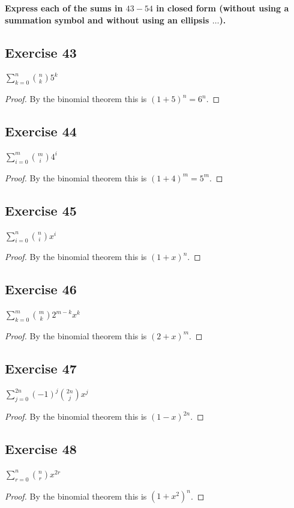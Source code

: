 \documentclass[14pt]{extarticle}
\newcommand{\dps}{\displaystyle}
\newcommand{\cy}{\color{cyan}}
\begin{document}
{\bf \cy Express each of the sums in \(43-54\) in closed form (without using a summation symbol and without using an
ellipsis \(\ldots\)).}

\subsection{Exercise 43}
\(\sum_{k=0}^{n} \binom{n}{k} 5^{k}\)
\begin{proof}
     By the binomial theorem this is \((1+5)^n = 6^n\).
\end{proof}

\subsection{Exercise 44}
\(\dps \sum_{i=0}^{m} \binom{m}{i} 4^{i}\)
\begin{proof}
     By the binomial theorem this is \((1+4)^m = 5^m\).
\end{proof}

\subsection{Exercise 45}
\(\dps \sum_{i=0}^{n} \binom{n}{i} x^{i}\)
\begin{proof}
     By the binomial theorem this is \((1+x)^n\).
\end{proof}

\subsection{Exercise 46}
\(\dps \sum_{k=0}^{m} \binom{m}{k} 2^{m-k}x^k\)
\begin{proof}
     By the binomial theorem this is \((2+x)^m\).
\end{proof}

\subsection{Exercise 47}
\(\dps \sum_{j=0}^{2n} (-1)^j \binom{2n}{j} x^{j}\)
\begin{proof}
     By the binomial theorem this is \((1-x)^{2n}\).
\end{proof}

\subsection{Exercise 48}
\(\dps \sum_{r=0}^{n} \binom{n}{r} x^{2r}\)
\begin{proof}
     By the binomial theorem this is \((1+x^2)^n\).
\end{proof}
\end{document}
